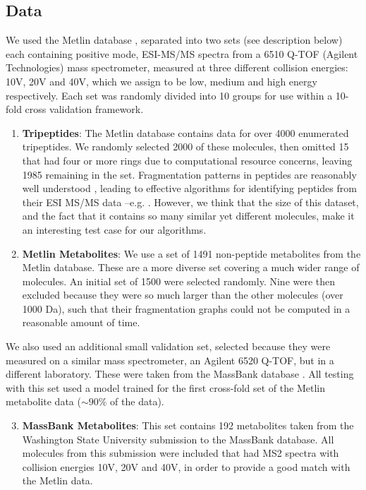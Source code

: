 \subsection{Data}
We used the Metlin database \citep{Smith2005},
separated into two sets (see description below) each containing positive mode, ESI-MS/MS spectra from a 6510 Q-TOF (Agilent Technologies) mass spectrometer, measured at three different collision energies: 10V, 20V and 40V, which we assign to be low, medium and high energy respectively.
Each set was randomly divided into 10 groups for use within a 10-fold cross validation framework.
\begin{enumerate}

\item \textbf{Tripeptides}: The Metlin database contains data for over 4000 enumerated tripeptides. We randomly selected 2000 of these molecules, then omitted 15 that had four or more rings due to computational resource concerns, leaving 1985 remaining in the set.
Fragmentation patterns in peptides are reasonably well understood \citep{Papayannopoulos1995, Paizs2005}, leading to effective algorithms for identifying peptides from their ESI MS/MS data --e.g. \citep{Pappin1999,Eng1994,Ma2003}.  
However, we think that the size of this dataset, and the fact that it contains so many similar yet different molecules, make it an interesting test case for our algorithms. 

\item \textbf{Metlin Metabolites}: We use a set of 1491 non-peptide metabolites from the Metlin database.  These are a more diverse set covering a much wider range of molecules. An initial set of 1500 were selected randomly. Nine were then excluded because they were so much larger than the other molecules (over 1000 Da), such that their fragmentation graphs could not be computed in a reasonable amount of time.
\end{enumerate}

We also used an additional small validation set, selected because they were measured on a similar mass spectrometer, an Agilent 6520 Q-TOF, but in a different laboratory. These were taken from the MassBank database \citep{Horai2010}. All testing with this set used a model trained for the first cross-fold set of the Metlin metabolite data ($\sim 90\%$ of the data).
\begin{enumerate}
\setcounter{enumi}{2}
\item \textbf{MassBank Metabolites}: This set contains 192 metabolites taken from the Washington State University submission to the MassBank database. All molecules from this submission were included that had MS2 spectra with collision energies 10V, 20V and 40V, in order to provide a good match with the Metlin data.
\end{enumerate}

